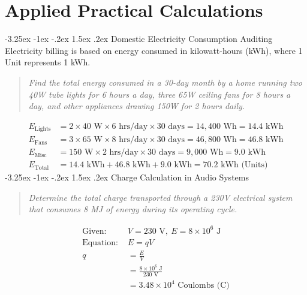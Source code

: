 \documentclass[11pt,a4paper]{report}
\makeatletter
\renewcommand{\section}{\@startsection{section}{1}{\z@}%
  {-3.25ex \@plus -1ex \@minus -.2ex}%
  {1.5ex \@plus.2ex}%
  {\normalfont\Large\bfseries\color{primaryColor}}}
\makeatother
\begin{document}
\chapter{Applied Practical Calculations}
\section{Domestic Electricity Consumption Auditing}
Electricity billing is based on energy consumed in kilowatt-hours (kWh), where 1 Unit represents 1 kWh.
\begin{quote}\textit{Find the total energy consumed in a 30-day month by a home running two 40W tube lights for 6 hours a day, three 65W ceiling fans for 8 hours a day, and other appliances drawing 150W for 2 hours daily.}\end{quote}
\begin{align*}
E_{\text{Lights}} &= 2 \times 40\text{ W} \times 6\text{ hrs/day} \times 30\text{ days} = 14{,}400\text{ Wh} = 14.4\text{ kWh} \\
E_{\text{Fans}}   &= 3 \times 65\text{ W} \times 8\text{ hrs/day} \times 30\text{ days} = 46{,}800\text{ Wh} = 46.8\text{ kWh} \\
E_{\text{Misc}}   &= 150\text{ W} \times 2\text{ hrs/day} \times 30\text{ days} = 9{,}000\text{ Wh} = 9.0\text{ kWh} \\
E_{\text{Total}}  &= 14.4\text{ kWh} + 46.8\text{ kWh} + 9.0\text{ kWh} = 70.2\text{ kWh (Units)}
\end{align*}
\section{Charge Calculation in Audio Systems}
\begin{quote}\textit{Determine the total charge transported through a 230V electrical system that consumes 8 MJ of energy during its operating cycle.}\end{quote}
\begin{align*}
\text{Given: } &V = 230\text{ V}, \ E = 8 \times 10^6\text{ J} \\
\text{Equation: } &E = qV \\
q &= \frac{E}{V} \\
  &= \frac{8 \times 10^6\text{ J}}{230\text{ V}} \\
  &= 3.48 \times 10^4\text{ Coulombs (C)}
\end{align*}
\end{document}
